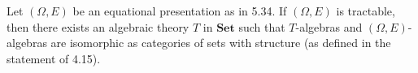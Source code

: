 Let $(\Omega, E)$ be an equational presentation as in 5.34. If $(\Omega, E)$ is tractable, then there exists an algebraic theory $T$ in $\mathbf{Set}$ such that $T$-algebras and $(\Omega, E)$-algebras are isomorphic as categories of sets with structure (as defined in the statement of 4.15).
